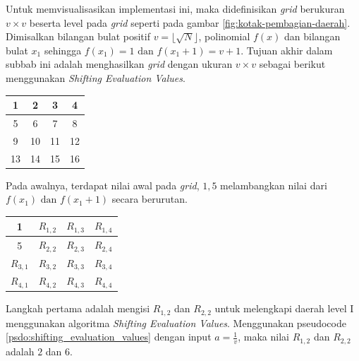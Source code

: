 Untuk memvisualisasikan implementasi ini, maka didefinisikan \textit{\textit{grid}} berukuran $ v \times v $ beserta level pada \textit{\textit{grid}} seperti pada gambar \ref{fig:kotak-pembagian-daerah}. Dimisalkan bilangan bulat positif $ v = \lfloor \sqrt{N} \rfloor $, polinomial $ f(x) $ dan bilangan bulat $ x_1 $ sehingga $ f(x_1) = 1 \text{ dan } f(x_1+1) = v+1 $. Tujuan akhir dalam subbab ini adalah menghasilkan \textit{\textit{grid}} dengan ukuran $ v \times v $ sebagai berikut menggunakan \textit{Shifting Evaluation Values}.

\begin{table}[H]
	\centering
	\begin{tabular}{|c|c|c|c|} \hline
	1  & 2  & 3  & 4  \\ \hline
	5  & 6  & 7  & 8  \\ \hline
	9  & 10 & 11 & 12 \\ \hline
	13 & 14 & 15 & 16 \\ \hline
	\end{tabular}
\end{table}

Pada awalnya, terdapat nilai awal pada \textit{\textit{grid}}, $ 1 , 5 $ melambangkan nilai dari $ f(x_1) \text{ dan } f(x_1 + 1) $ secara berurutan. 
\begin{table}[H]
	\centering
	\begin{tabular}{|c|c|c|c|} \hline
	1  & $ R_{1,2} $ & $ R_{1,3} $ & $ R_{1,4} $ \\ \hline
	5  & $ R_{2,2} $ & $ R_{2,3} $ & $ R_{2,4} $ \\ \hline
	$ R_{3,1} $  & $ R_{3,2} $ & $ R_{3,3} $ & $ R_{3,4} $ \\ \hline
	$ R_{4,1} $  & $ R_{4,2} $ & $ R_{4,3} $ & $ R_{4,4} $ \\ \hline
	\end{tabular}
\end{table}
Langkah pertama adalah mengisi $ R_{1,2} $ dan $ R_{2,2} $ untuk melengkapi daerah level I menggunakan algoritma \textit{Shifting Evaluation Values}. Menggunakan pseudocode \ref{psdo:shifting_evaluation_values} dengan input $ a = \frac{1}{v} $, maka nilai $ R_{1,2} $ dan $ R_{2,2} $ adalah $ 2 $ dan $ 6 $. 

